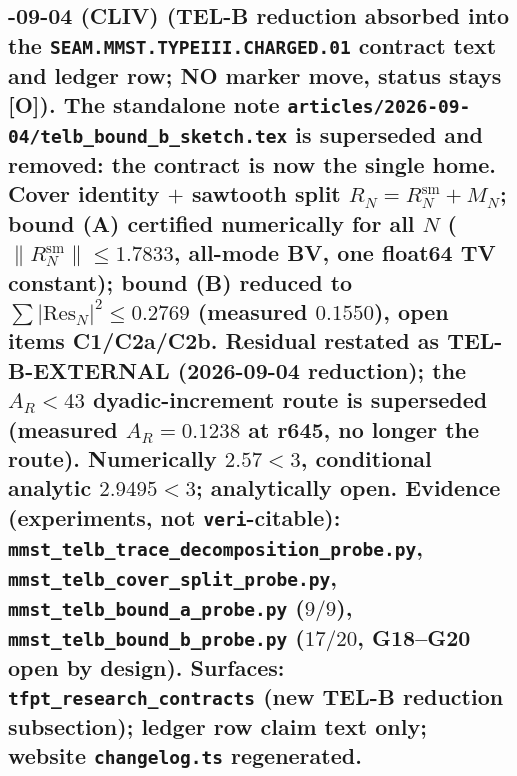 \documentclass[11pt]{article}
\providecommand{\mO}{\textbf{[O]}}\providecommand{\mX}{\textbf{[X]}}
\begin{document}
\subsection*{-09-04 (CLIV) (TEL-B reduction absorbed into the \texttt{SEAM.MMST.TYPEIII.CHARGED.01} contract text and ledger row; NO marker move, status stays \mO).  The standalone note \texttt{articles/2026-09-04/telb\_bound\_b\_sketch.tex} is superseded and removed: the contract is now the single home.  Cover identity $+$ sawtooth split $R_N=R^{\mathrm{sm}}_N+M_N$; bound (A) certified numerically for all $N$ ($\lVert R^{\mathrm{sm}}_N\rVert\le1.7833$, all-mode BV, one float64 TV constant); bound (B) reduced to $\sum\lvert\mathrm{Res}_N\rvert^2\le0.2769$ (measured $0.1550$), open items C1/C2a/C2b.  Residual restated as TEL-B-EXTERNAL (2026-09-04 reduction); the $A_R<43$ dyadic-increment route is superseded (measured $A_R=0.1238$ at r645, no longer the route).  Numerically $2.57<3$, conditional analytic $2.9495<3$; analytically open.  Evidence (experiments, not \texttt{veri}-citable): \texttt{mmst\_telb\_trace\_decomposition\_probe.py}, \texttt{mmst\_telb\_cover\_split\_probe.py}, \texttt{mmst\_telb\_bound\_a\_probe.py} ($9/9$), \texttt{mmst\_telb\_bound\_b\_probe.py} ($17/20$, G18--G20 open by design).  Surfaces: \texttt{tfpt\_research\_contracts} (new TEL-B reduction subsection); ledger row claim text only; website \texttt{changelog.ts} regenerated.}
\end{document}
